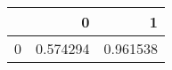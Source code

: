 \begin{tabular}{lrr}
\toprule
{} &         0 &         1 \\
\midrule
0 &  0.574294 &  0.961538 \\
\bottomrule
\end{tabular}
